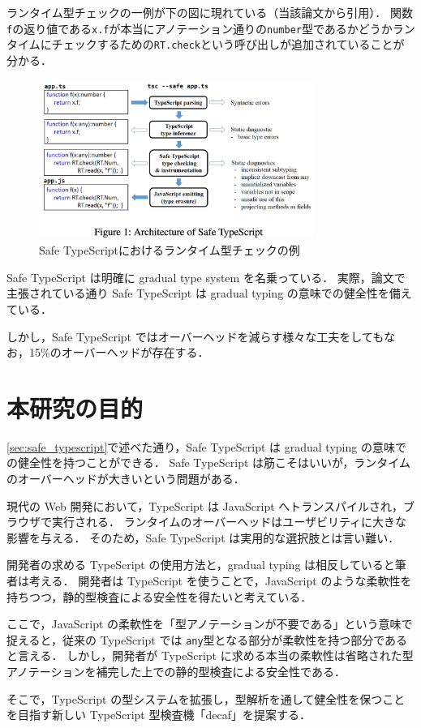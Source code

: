 ランタイム型チェックの一例が下の図に現れている（当該論文\cite{rastogi2015safe}から引用）．
関数\texttt{f}の返り値である\texttt{x.f}が本当にアノテーション通りの\texttt{number}型であるかどうかランタイムにチェックするための\texttt{RT.check}という呼び出しが追加されていることが分かる．

\begin{figure}[H]
    \centering
    \includegraphics[width=0.8\textwidth]{figures/fig_overview_safe_typescript.png}
    \caption{Safe TypeScriptにおけるランタイム型チェックの例}
\end{figure}

Safe TypeScript は明確に gradual type system を名乗っている．
実際，論文で主張されている通り Safe TypeScript は gradual typing の意味での健全性を備えている．

しかし，Safe TypeScript ではオーバーヘッドを減らす様々な工夫をしてもなお，15\%のオーバーヘッドが存在する．

\section{本研究の目的}

\ref{sec:safe_typescript}で述べた通り，Safe TypeScript は gradual typing の意味での健全性を持つことができる．
Safe TypeScript は筋こそはいいが，ランタイムのオーバーヘッドが大きいという問題がある．

現代の Web 開発において，TypeScript は JavaScript へトランスパイルされ，ブラウザで実行される．
ランタイムのオーバーヘッドはユーザビリティに大きな影響を与える．
そのため，Safe TypeScript は実用的な選択肢とは言い難い．

開発者の求める TypeScript の使用方法と，gradual typing は相反していると筆者は考える．
開発者は TypeScript を使うことで，JavaScript のような柔軟性を持ちつつ，静的型検査による安全性を得たいと考えている．

ここで，JavaScript の柔軟性を「型アノテーションが不要である」という意味で捉えると，従来の TypeScript では \texttt{any}型となる部分が柔軟性を持つ部分であると言える．
しかし，開発者が TypeScript に求める本当の柔軟性は省略された型アノテーションを補完した上での静的型検査による安全性である．

そこで，TypeScript の型システムを拡張し，型解析を通して健全性を保つことを目指す新しい TypeScript 型検査機「decaf」を提案する．
